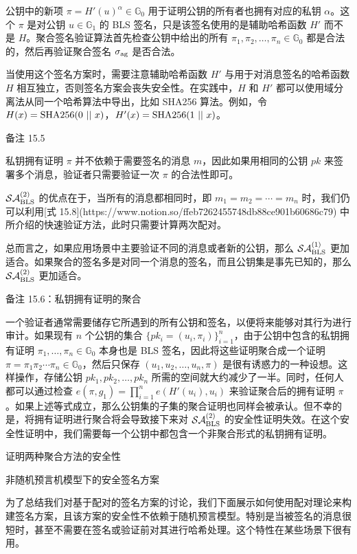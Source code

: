 公钥中的新项 $\pi=H'(u)^\alpha \in \mathbb{G}_0$ 用于证明公钥的所有者也拥有对应的私钥 $\alpha$。这个 $\pi$ 是对公钥 $u\in\mathbb{G}_1$ 的 BLS 签名，只是该签名使用的是辅助哈希函数 $H'$ 而不是 $H$。聚合签名验证算法首先检查公钥中给出的所有 $\pi_1,\pi_2,\dots,\pi_n\in\mathbb{G}_0$ 都是合法的，然后再验证聚合签名 $\sigma_{\rm ag}$ 是否合法。

当使用这个签名方案时，需要注意辅助哈希函数 $H'$ 与用于对消息签名的哈希函数 $H$ 相互独立，否则签名方案会丧失安全性。在实践中，$H$ 和 $H'$ 都可以使用域分离法从同一个哈希算法中导出，比如 SHA256 算法。例如，令 $H(x)={\rm SHA256}(0~||~x)$，$H'(x)={\rm SHA256}(1~||~x)$。

备注 15.5

私钥拥有证明 $\pi$ 并不依赖于需要签名的消息 $m$，因此如果用相同的公钥 $pk$ 来签署多个消息，验证者只需要验证一次 $\pi$ 的合法性即可。

$\mathcal{SA}_{\rm BLS}^{(2)}$ 的优点在于，当所有的消息都相同时，即 $m_1=m_2=\cdots=m_n$ 时，我们仍可以利用[式 15.8](https://www.notion.so/ffeb7262455748db88ce901b60686c79) 中所介绍的快速验证方法，此时只需要计算两次配对。

总而言之，如果应用场景中主要验证不同的消息或者新的公钥，那么 $\mathcal{SA}_{\rm BLS}^{(1)}$ 更加适合。如果聚合的签名多是对同一个消息的签名，而且公钥集是事先已知的，那么 $\mathcal{SA}_{\rm BLS}^{(2)}$ 更加适合。

备注 15.6：私钥拥有证明的聚合

一个验证者通常需要储存它所遇到的所有公钥和签名，以便将来能够对其行为进行审计。如果现有 $n$ 个公钥的集合 $\{pk_i=(u_i,\pi_i)\}_{i=1}^{n}$，由于公钥中包含的私钥拥有证明 $\pi_1,\dots,\pi_n\in\mathbb{G}_0$ 本身也是 BLS 签名，因此将这些证明聚合成一个证明 $\pi=\pi_1\pi_2\cdots\pi_n\in\mathbb{G}_0$，然后只保存 $(u_1,u_2,\dots,u_n,\pi)$ 是很有诱惑力的一种设想。这样操作，存储公钥 $pk_1,pk_2,\dots,pk_n$ 所需的空间就大约减少了一半。同时，任何人都可以通过检查 $e(\pi,g_1)=\prod_{i=1}^ne(H'(u_i),u_i)$ 来验证聚合后的拥有证明 $\pi$。如果上述等式成立，那么公钥集的子集的聚合证明也同样会被承认。但不幸的是，将拥有证明进行聚合将会导致接下来对 $\mathcal{SA}_{\rm BLS}^{(2)}$ 的安全性证明失效。在这个安全性证明中，我们需要每一个公钥中都包含一个非聚合形式的私钥拥有证明。

证明两种聚合方法的安全性

非随机预言机模型下的安全签名方案

为了总结我们对基于配对的签名方案的讨论，我们下面展示如何使用配对理论来构建签名方案，且该方案的安全性不依赖于随机预言模型。特别是当被签名的消息很短时，甚至不需要在签名或验证前对其进行哈希处理。这个特性在某些场景下很有用。

